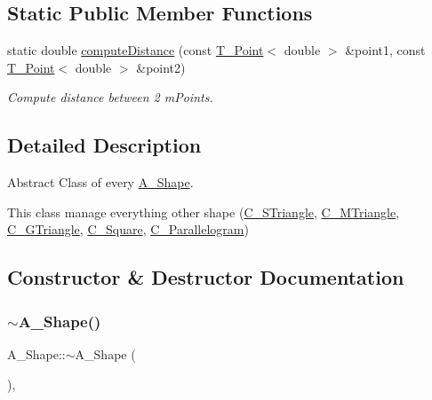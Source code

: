 \subsection*{Static Public Member Functions}
\begin{DoxyCompactItemize}
\item 
static double \hyperlink{classA__Shape_a2c663e21cf31002323b83f9f98234d33}{compute\+Distance} (const \hyperlink{classT__Point}{T\+\_\+\+Point}$<$ double $>$ \&point1, const \hyperlink{classT__Point}{T\+\_\+\+Point}$<$ double $>$ \&point2)
\begin{DoxyCompactList}\small\item\em Compute distance between 2 m\+Points. \end{DoxyCompactList}\end{DoxyCompactItemize}


\subsection{Detailed Description}
Abstract Class of every \hyperlink{classA__Shape}{A\+\_\+\+Shape}. 

This class manage everything other shape (\hyperlink{classC__STriangle}{C\+\_\+\+S\+Triangle}, \hyperlink{classC__MTriangle}{C\+\_\+\+M\+Triangle}, \hyperlink{classC__GTriangle}{C\+\_\+\+G\+Triangle}, \hyperlink{classC__Square}{C\+\_\+\+Square}, \hyperlink{classC__Parallelogram}{C\+\_\+\+Parallelogram}) 

\subsection{Constructor \& Destructor Documentation}
\mbox{\label{classA__Shape_ad0a3bcb28f3d4f42043ea8c592bb5f1f}} 
\subsubsection{\texorpdfstring{$\sim$\+A\+\_\+\+Shape()}{~A\_Shape()}}
{\footnotesize\ttfamily A\+\_\+\+Shape\+::$\sim$\+A\+\_\+\+Shape (\begin{DoxyParamCaption}{ }\end{DoxyParamCaption})\hspace{0.3cm}{\ttfamily [pure virtual]}, {\ttfamily [default]}}



